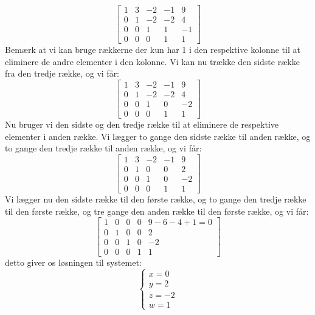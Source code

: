 \documentclass{article}
\begin{document}
\begin{equation}
\left[
\begin{array}{rrrr|r}
1 & 3 & -2 & -1 & 9 \\
0 & 1 & -2 & -2 & 4 \\
0 & 0 & 1 & 1 & -1 \\
0 & 0 & 0 & 1 & 1
\end{array}
\right]
\end{equation}
Bemærk at vi kan bruge rækkerne der kun har 1 i den respektive kolonne til at eliminere de andre elementer i den kolonne. Vi kan nu trække den sidste række fra den tredje række, og vi får:
\begin{equation}
\left[
\begin{array}{rrrr|r}
1 & 3 & -2 & -1 & 9 \\
0 & 1 & -2 & -2 & 4 \\
0 & 0 & 1 & 0 & -2 \\
0 & 0 & 0 & 1 & 1
\end{array}
\right]
\end{equation}
Nu bruger vi den sidste og den tredje række til at eliminere de respektive elementer i anden række. Vi lægger to gange den sidste række til anden række, og to gange den tredje række til anden række, og vi får:
\begin{equation}
\left[
\begin{array}{rrrr|r}
1 & 3 & -2 & -1 & 9 \\
0 & 1 & 0 & 0 & 2 \\
0 & 0 & 1 & 0 & -2 \\
0 & 0 & 0 & 1 & 1
\end{array}
\right]
\end{equation}
Vi lægger nu den sidste række til den første række, og to gange den tredje række til den første række, og tre gange den anden række til den første række, og vi får:
\begin{equation}
\left[
\begin{array}{rrrr|r}
1 & 0 & 0 & 0 & 9 - 6 - 4 + 1 = 0 \\
0 & 1 & 0 & 0 & 2 \\
0 & 0 & 1 & 0 & -2 \\
0 & 0 & 0 & 1 & 1
\end{array}
\right]
\end{equation}
detto giver os løsningen til systemet:
\begin{equation}
\begin{cases}
x = 0 \\
y = 2 \\
z = -2 \\
w = 1
\end{cases}
\end{equation}
\end{document}
